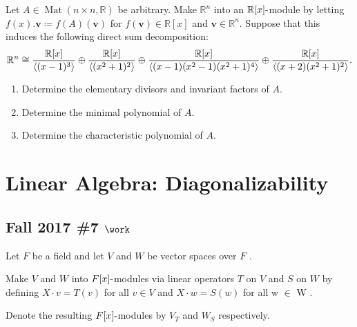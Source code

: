 Let \(A \in \operatorname{Mat}(n\times n, {\mathbb{R}})\) be arbitrary.
Make \({\mathbb{R}}^n\) into an \({\mathbb{R}}[x]{\hbox{-}}\)module by
letting \(f(x).\mathbf{v} \coloneqq f(A)(\mathbf{v})\) for
\(f(\mathbf{v})\in {\mathbb{R}}[x]\) and
\(\mathbf{v} \in {\mathbb{R}}^n\). Suppose that this induces the
following direct sum decomposition:
\begin{align*}
{\mathbb{R}}^n \cong
{ {\mathbb{R}}[x] \over \left\langle{ (x-1)^3 }\right\rangle }
\oplus
{ {\mathbb{R}}[x] \over \left\langle{ (x^2+1)^2 }\right\rangle }
\oplus
{ {\mathbb{R}}[x] \over \left\langle{ (x-1)(x^2-1)(x^2+1)^4 }\right\rangle }
\oplus
{ {\mathbb{R}}[x] \over \left\langle{ (x+2)(x^2+1)^2 }\right\rangle }
.\end{align*}

\begin{enumerate}
\def\labelenumi{\alph{enumi}.}
\item
  Determine the elementary divisors and invariant factors of \(A\).
\item
  Determine the minimal polynomial of \(A\).
\item
  Determine the characteristic polynomial of \(A\).
\end{enumerate}

\hypertarget{linear-algebra-diagonalizability}{%
\section{Linear Algebra:
Diagonalizability}\label{linear-algebra-diagonalizability}}

\hypertarget{fall-2017-7-work}{%
\subsection{\texorpdfstring{Fall 2017 \#7
\(\work\)}{Fall 2017 \#7 \textbackslash work}}\label{fall-2017-7-work}}

Let \(F\) be a field and let \(V\) and \(W\) be vector spaces over \(F\)
.

Make \(V\) and \(W\) into \(F[x]{\hbox{-}}\)modules via linear operators
\(T\) on \(V\) and \(S\) on \(W\) by defining \(X \cdot v = T (v)\) for
all \(v \in V\) and \(X \cdot w = S(w)\) for all w \(\in\) W .

Denote the resulting \(F[x]{\hbox{-}}\)modules by \(V_T\) and \(W_S\)
respectively.

